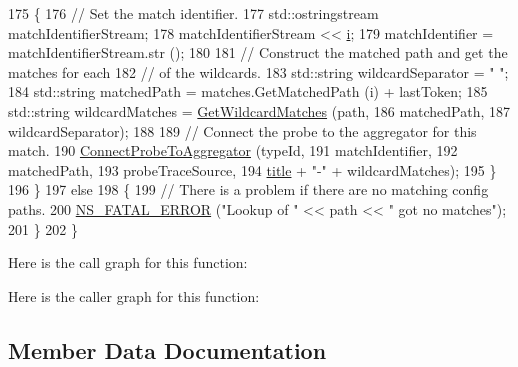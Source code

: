 \begin{DoxyCode}
175         \{
176           \textcolor{comment}{// Set the match identifier.}
177           std::ostringstream matchIdentifierStream;
178           matchIdentifierStream << \hyperlink{bernuolliDistribution_8m_a6f6ccfcf58b31cb6412107d9d5281426}{i};
179           matchIdentifier = matchIdentifierStream.str ();
180 
181           \textcolor{comment}{// Construct the matched path and get the matches for each}
182           \textcolor{comment}{// of the wildcards.}
183           std::string wildcardSeparator = \textcolor{stringliteral}{" "};
184           std::string matchedPath = matches.GetMatchedPath (i) + lastToken;
185           std::string wildcardMatches = \hyperlink{namespacens3_ab2d3424cd46a0cf26722b70079835354}{GetWildcardMatches} (path,
186                                                             matchedPath,
187                                                             wildcardSeparator);
188 
189           \textcolor{comment}{// Connect the probe to the aggregator for this match.}
190           \hyperlink{classns3_1_1GnuplotHelper_ad80ba9cf7fe4c4c5fc9c165d7d04955d}{ConnectProbeToAggregator} (typeId,
191                                     matchIdentifier,
192                                     matchedPath,
193                                     probeTraceSource,
194                                     \hyperlink{lte__link__budget_8m_a5b09b57ee35b13a452f0c089c0709f8b}{title} + \textcolor{stringliteral}{"-"} + wildcardMatches);
195         \}
196     \}
197   \textcolor{keywordflow}{else}
198     \{
199       \textcolor{comment}{// There is a problem if there are no matching config paths.}
200       \hyperlink{group__fatal_ga5131d5e3f75d7d4cbfd706ac456fdc85}{NS\_FATAL\_ERROR} (\textcolor{stringliteral}{"Lookup of "} << path << \textcolor{stringliteral}{" got no matches"});
201     \}
202 \}
\end{DoxyCode}


Here is the call graph for this function\+:




Here is the caller graph for this function\+:




\subsection{Member Data Documentation}
